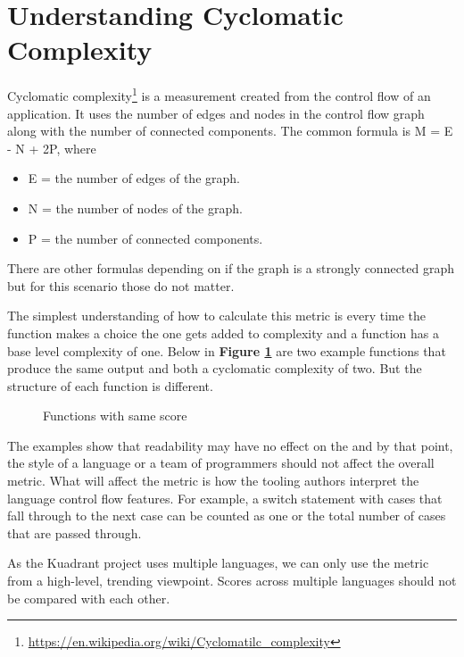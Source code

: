 \section{Understanding Cyclomatic Complexity}

Cyclomatic complexity\footnote{\href{https://en.wikipedia.org/wiki/Cyclomatic_complexity}{https://en.wikipedia.org/wiki/Cyclomatilc\_complexity}} is a measurement created from the control flow of an application.
It uses the number of edges and nodes in the control flow graph along with the number of connected components.
The common formula is M = E - N + 2P, where
\begin{itemize}
	\item E = the number of edges of the graph.
	\item N = the number of nodes of the graph.
	\item P = the number of connected components.
\end{itemize}
There are other formulas depending on if the graph is a strongly connected graph but for this scenario those do not matter.

The simplest understanding of how to calculate this metric is every time the function makes a choice the one gets added to complexity and a function has a base level complexity of one.
Below in \textbf{Figure \ref{fig:code1}} are two example functions that produce the same output and both a cyclomatic complexity of two.
But the structure of each function is different.

\begin{figure}
	
	\caption{Functions with same \cc score}
	\label{fig:code1}
\end{figure}

The examples show that readability may have no effect on the \cc and by that point, the style of a language or a team of programmers should not affect the overall metric.
What will affect the metric is how the tooling authors interpret the language control flow features.
For example, a switch statement with cases that fall through to the next case can be counted as one or the total number of cases that are passed through.

As the Kuadrant project uses multiple languages, we can only use the metric from a high-level, trending viewpoint.
Scores across multiple languages should not be compared with each other.

